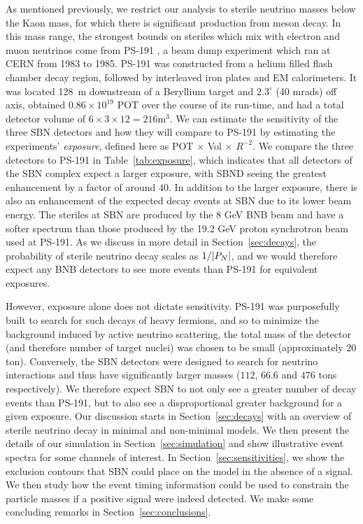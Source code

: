 \documentclass[11pt, a4paper]{article}
\newcommand{\refsec}[1]{Section~\ref{#1}}
\newcommand{\reftab}[1]{Table~\ref{#1}}
\def\ster{\ensuremath N}
\begin{document}
As mentioned previously, we restrict our analysis to sterile neutrino masses
below the Kaon mass, for which there is significant production from meson
decay. In this mass range, the strongest bounds on steriles which mix with
electron and muon neutrinos come from PS-191 \cite{Bernardi:1985ny,
Bernardi:1987ek}, a beam dump experiment which ran at CERN from 1983 to 1985. 
%
PS-191 was constructed from a helium filled flash chamber decay region,
followed by interleaved iron plates and EM calorimeters. It was located 128~m
downstream of a Beryllium target and $2.3^\circ$ (40 mrads) off axis, obtained
$0.86 \times 10^{19}$ POT over the course of its run-time, and had a total
detector volume of $6\times3\times12 = 216 \text{m}^3$. We can estimate the
sensitivity of the three SBN detectors and how they will compare to PS-191 by
estimating the experiments' \emph{exposure}, defined here as POT $\times$ Vol
$\times$ $R^{-2}$. We compare the three detectors to PS-191 in
\reftab{tab:exposure}, which indicates that all detectors of the SBN complex
expect a larger exposure, with SBND seeing the greatest enhancement by a factor
of around $40$. 
%
In addition to the larger exposure, there is also an enhancement of the
expected decay events at SBN due to its lower beam energy. The steriles at SBN
are produced by the 8 GeV BNB beam and have a softer spectrum than those
produced by the 19.2 GeV proton synchrotron beam used at PS-191. As we discuss
in more detail in \refsec{sec:decays}, the probability of sterile neutrino
decay scales as $1/|P_\ster|$, and we would therefore expect any BNB detectors to
see more events than PS-191 for equivalent exposures.

However, exposure alone does not dictate sensitivity. PS-191 was purposefully
built to search for such decays of heavy fermions, and so to minimize
the background induced by active neutrino scattering, the total mass of the
detector (and therefore number of target nuclei) was chosen to be small
(approximately $20$ ton). Conversely, the SBN detectors were designed to search
for neutrino interactions and thus have significantly larger masses ($112$,
$66.6$ and $476$ tons respectively). We therefore expect SBN to not only see a
greater number of decay events than PS-191, but to also see a disproportional
greater background for a given exposure.
%
Our discussion starts in \refsec{sec:decays} with an overview of sterile
neutrino decay in minimal and non-minimal models. We then present the details
of our simulation in \refsec{sec:simulation} and show illustrative event
spectra for some channels of interest. In \refsec{sec:sensitivities}, we show
the exclusion contours that SBN could place on the model in the absence of a
signal. We then study how the event timing information could be used to
constrain the particle masses if a positive signal were indeed detected. We
make some concluding remarks in \refsec{sec:conclusions}.
\end{document}
